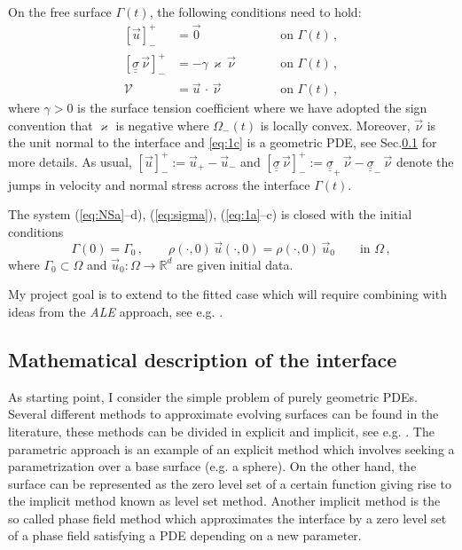 \documentclass[a4paper,11pt, onecolumn]{article}
\newcommand{\cor}[1]{\textit{#1}} %
\begin{document}
On the free surface $\Gamma(t)$, the following conditions need to hold:
\begin{subequations}
 \begin{alignat}{2}
  [\vec u]_-^+ & = \vec 0 \qquad &&\mbox{on } \Gamma(t)\,, \label{eq:1a} \\
  [\underline{\underline{\sigma}}\,\vec \nu]_-^+ & = -\gamma\,\varkappa\,\vec
  \nu \qquad &&\mbox{on } \Gamma(t)\,, \label{eq:1b} \\
  \mathcal{V} &= \vec u\,\cdot\,\vec \nu \qquad &&\mbox{on } \Gamma(t)\,,
  \label{eq:1c}
 \end{alignat}
\end{subequations}
where $\gamma>0$ is the surface tension coefficient where we have adopted the
sign convention that $\varkappa$ is negative where $\Omega_-(t)$ is locally
convex. Moreover, $\vec{\nu}$ is the unit normal to the interface and
\eqref{eq:1c} is a geometric PDE, see Sec.\ref{subsec:math_form_interface} for
more details. As usual, $[\vec u]_-^+ := \vec u_+ - \vec u_-$ and
$[\underline{\underline{\sigma}}\,\vec\nu]_-^+ :=
\underline{\underline{\sigma}}_+\,\vec\nu -
\underline{\underline{\sigma}}_-\,\vec\nu$ denote the jumps in velocity and
normal stress across the interface $\Gamma(t)$.
\newline

The system (\ref{eq:NSa}--d), (\ref{eq:sigma}), (\ref{eq:1a}--c) is
closed with the initial conditions
\begin{equation} \label{eq:1d}
 \Gamma(0) = \Gamma_0 \,, \qquad \rho(\cdot,0)\,\vec u(\cdot,0) =
\rho(\cdot,0)\,\vec u_0 \qquad \mbox{in } \Omega\,,
\end{equation}
where $\Gamma_0 \subset \Omega$ and $\vec u_0 : \Omega \to \mathbb{R}^d$ are
given initial data.
\newline

My project goal is to extend \cite{spurious,fluidfbp} to the fitted
case which will require combining \cite{spurious,fluidfbp} with ideas from the
\cor{ALE} approach, see e.g. \cite{HughesLZ81,Ganesan06,GerbeauLL06}.

\subsection{Mathematical description of the interface}
\label{subsec:math_form_interface}

As starting point, I consider the simple problem of purely geometric PDEs.
Several different methods to approximate evolving surfaces can be found in the
literature, these methods can be divided in explicit and implicit, see e.g.
\cite{DeckelnickDE05}. The parametric approach is an example of an explicit
method which involves seeking a parametrization over a base surface (e.g. a
sphere). On the other hand, the surface can be represented as the zero level set
of a certain function giving rise to the implicit method known as level set
method. Another implicit method is the so called phase field method which
approximates the interface by a zero level set of a phase field satisfying a PDE
depending on a new parameter.
\newline
\end{document}
